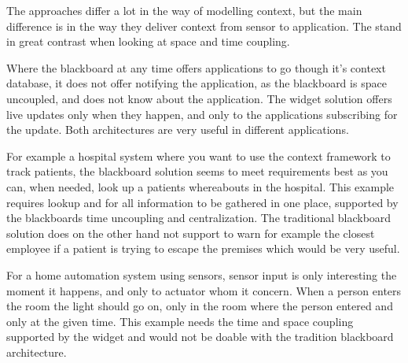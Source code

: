 \documentclass[../report.tex]{subfiles}
\begin{document}
The approaches differ a lot in the way of modelling context, but the main difference is in the way they deliver context from sensor to application. The stand in great contrast when looking at space and time coupling. 

Where the blackboard at any time offers applications to go though it's context database, it does not offer notifying the application, as the blackboard is space uncoupled, and does not know about the application. The widget solution offers live updates only when they happen, and only to the applications subscribing for the update. Both architectures are very useful in different applications.

For example a hospital system where you want to use the context framework to track patients, the blackboard solution seems to meet requirements best as you can, when needed, look up a patients whereabouts in the hospital.
This example requires lookup and for all information to be gathered in one place, supported by the blackboards time uncoupling and centralization. The traditional blackboard solution does on the other hand not support to warn for example the closest employee if a patient is trying to escape the premises which would be very useful.

For a home automation system using sensors, sensor input is only interesting the moment it happens, and only to actuator whom it concern. When a person enters the room the light should go on, only in the room where the person entered and only at the given time. This example needs the time and space coupling supported by the widget and would not be doable with the tradition blackboard architecture.
\end{document}
